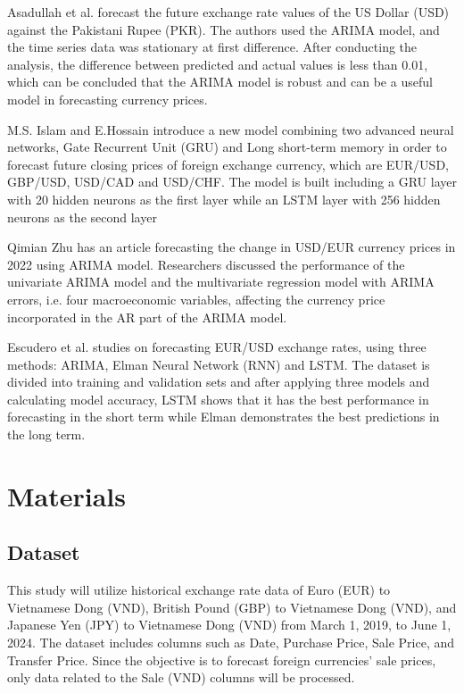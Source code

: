 \documentclass{ieeeojies}
\begin{document}
Asadullah et al. \cite{rw2} forecast the future exchange rate values of the US Dollar (USD) against the Pakistani Rupee (PKR). The authors used the ARIMA model, and the time series data was stationary at first difference. After conducting the analysis, the difference between predicted and actual values is less than 0.01, which can be concluded that the ARIMA model is robust and can be a useful model in forecasting currency prices.

M.S. Islam and E.Hossain \cite{rw3} introduce a new model combining two advanced neural networks, Gate Recurrent Unit (GRU) and Long short-term memory in order to forecast future closing prices of foreign exchange currency, which are EUR/USD, GBP/USD, USD/CAD and USD/CHF. The model is built including a GRU layer with 20 hidden neurons as the first layer while an LSTM layer with 256 hidden neurons as the second layer

Qimian Zhu \cite{rw4} has an article forecasting the change in USD/EUR currency prices in 2022 using ARIMA model. Researchers discussed the performance of the univariate ARIMA model and the multivariate regression model with ARIMA errors, i.e. four macroeconomic variables, affecting the currency price incorporated in the AR part of the ARIMA model.

Escudero et al. \cite{rw5} studies on forecasting EUR/USD exchange rates, using three methods: ARIMA, Elman Neural Network (RNN) and LSTM. The dataset is divided into training and validation sets and after applying three models and calculating model accuracy, LSTM shows that it has the best performance in forecasting in the short term while Elman demonstrates the best predictions in the long term.

\section{Materials}
\subsection{Dataset}
\justify
This study will utilize historical exchange rate data of Euro (EUR) to Vietnamese Dong (VND), British Pound (GBP) to Vietnamese Dong (VND), and Japanese Yen (JPY) to Vietnamese Dong (VND) from March 1, 2019, to June 1, 2024. The dataset includes columns such as Date, Purchase Price, Sale Price, and Transfer Price. Since the objective is to forecast foreign currencies' sale prices, only data related to the Sale (VND) columns will be processed.
\end{document}
